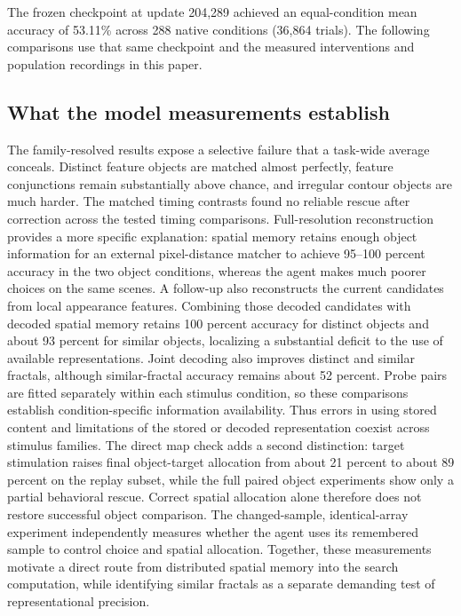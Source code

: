 \documentclass[11pt]{article}
\begin{document}
The frozen checkpoint at update 204,289 achieved an equal-condition mean accuracy of 53.11\% across 288 native conditions (36,864 trials). The following comparisons use that same checkpoint and the measured interventions and population recordings in this paper.

\subsection{What the model measurements establish}
The family-resolved results expose a selective failure that a task-wide average conceals. Distinct feature objects are matched almost perfectly, feature conjunctions remain substantially above chance, and irregular contour objects are much harder. The matched timing contrasts found no reliable rescue after correction across the tested timing comparisons. Full-resolution reconstruction provides a more specific explanation: spatial memory retains enough object information for an external pixel-distance matcher to achieve 95--100 percent accuracy in the two object conditions, whereas the agent makes much poorer choices on the same scenes. A follow-up also reconstructs the current candidates from local appearance features. Combining those decoded candidates with decoded spatial memory retains 100 percent accuracy for distinct objects and about 93 percent for similar objects, localizing a substantial deficit to the use of available representations. Joint decoding also improves distinct and similar fractals, although similar-fractal accuracy remains about 52 percent. Probe pairs are fitted separately within each stimulus condition, so these comparisons establish condition-specific information availability. Thus errors in using stored content and limitations of the stored or decoded representation coexist across stimulus families. The direct map check adds a second distinction: target stimulation raises final object-target allocation from about 21 percent to about 89 percent on the replay subset, while the full paired object experiments show only a partial behavioral rescue. Correct spatial allocation alone therefore does not restore successful object comparison. The changed-sample, identical-array experiment independently measures whether the agent uses its remembered sample to control choice and spatial allocation. Together, these measurements motivate a direct route from distributed spatial memory into the search computation, while identifying similar fractals as a separate demanding test of representational precision.
\end{document}
